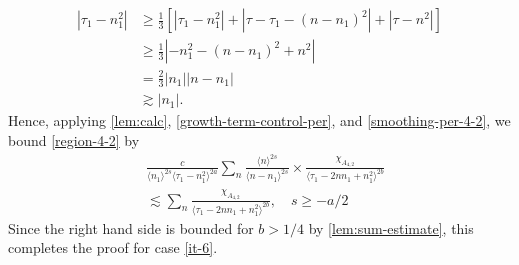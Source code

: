 \documentclass[12pt,reqno]{amsart}
\numberwithin{equation}{section}  %
\begin{document}
\begin{equation}
  \label{smoothing-per-4-2}
\begin{split}
  | \tau_{1} - n_{1}^{2} |
  & \ge \frac{1}{3}\left[ | \tau_{1} - n_{1}^{2} | + | \tau -
  \tau_{1} - (n - n_{1})^{2}
  | + | \tau - n^{2} | \right]
  \\
  & \ge \frac{1}{3} | - n_{1}^{2} - (n - n_{1})^{2} + n^{2} |
  \\
  & = \frac{2}{3} | n_{1} | | n - n_{1} |
  \\
  & \gtrsim | n_{1} |.
\end{split}
\end{equation}
Hence, applying
\cref{lem:calc}, \eqref{growth-term-control-per}, and
\eqref{smoothing-per-4-2}, we bound \eqref{region-4-2} by
%
%
\begin{equation*}
\begin{split}
&  \frac{c}{\langle n_{1} \rangle ^{2s}
  \langle \tau_{1} - n_{1}^{2} \rangle
  ^{2a}} \sum_{n} \frac{\langle n \rangle ^{2s}}{\langle
  n - n_{1}\rangle ^{2s}}  \times \frac{\chi_{A_{4,2}}}{\langle
  \tau_{1} - 2nn_{1} + n_{1}^{2} \rangle^{2b} } 
  \\
  & \lesssim 
  \sum_{n} \frac{\chi_{A_{4,2}}}{\langle
  \tau_{1} - 2nn_{1} + n_{1}^{2} \rangle^{2b} },
  \quad  s \ge -a/2
  \end{split}
\end{equation*}
%
%
Since the right hand side is bounded for $b > 1/4$ by \cref{lem:sum-estimate}, this
completes the proof for case \eqref{it-6}.
\end{document}

